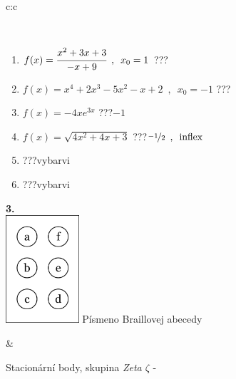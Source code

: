 \documentclass[10pt]{report}
\begin{document}
\begin{tabular}{c:c}
\begin{minipage}[c][104.5mm][t]{0.5\linewidth}
\begin{center}
\begin{minipage}{0.95\linewidth}
\begin{center}
\end{center}
\end{minipage}
\\[1mm]
\begin{minipage}{0.79\linewidth}
\begin{center}
\begin{varwidth}{\linewidth}
\begin{enumerate}
\normalsize
\item $f(x)=\cfrac{x^2+3x+3}{-x+9}\enspace , \enspace x_0=1$\quad \dotfill\; ???\;\dotfill \quad {}
\item $f(x)=x^4+2x^3-5x^2-x+2\enspace , \enspace x_0=-1$\quad \dotfill\; ???\;\dotfill \quad {}
\item $f(x)=-4xe^{3x}$\quad \dotfill\; ???\;\dotfill \quad $-1$
\item $f(x)=\sqrt{4x^2+4x+3}$\quad \dotfill\; ???\;\dotfill \quad $\nicefrac{-1}{2}\enspace , \enspace\mathrm{inflex}$
\item \quad \dotfill\; ???\;\dotfill \quad vybarvi
\item \quad \dotfill\; ???\;\dotfill \quad vybarvi
\end{enumerate}
\end{varwidth}
\end{center}
\end{minipage}
\begin{minipage}{0.20\linewidth}
\begin{center}
{\Huge\bfseries 3.} \\[2mm]
\includegraphics[height=40mm]{../images/braille.png}
{\small Písmeno Braillovej abecedy}
\end{center}
\end{minipage}
\end{center}
\end{minipage}
&
\begin{minipage}[c][104.5mm][t]{0.5\linewidth}
\begin{center}
\vspace{7mm}
{\huge Stacionární body, skupina \textit{Zeta $\zeta$} -}\\[5mm]

\end{center}
\end{minipage}
\end{tabular}
\end{document}
